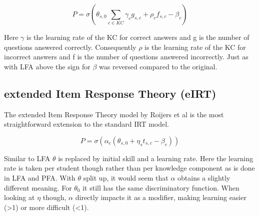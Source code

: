 \documentclass{scrartcl}
\begin{document}
\begin{equation}
P = \sigma(\theta_{s,0} \sum_{c \in KC}  \gamma_{c} g_{s,c} + \rho_{c} f_{s,c} - \beta_{c})
\end{equation}

Here $\gamma$ is the learning rate of the KC for correct answers and g is the number of questions answered correctly. Consequently $\rho$ is the learning rate of the KC for incorrect answers and f is the number of questions answered incorrectly. Just as with LFA above the sign for $\beta$ was reversed compared to the original.

\begin{comment}
To compare the PFA parameter values to LFA values, the weighted average (according to the ratio g:f for each problem) of $\gamma$ and $\rho$ should be compared to $\eta$. $\theta$ cannot be compared when comparing PFA on LFA data, vice versa, $\theta$ should be compared to 0. In case of PFA+ $\theta$ values can be compared directly.

\begin{mycapequ}
\begin{equation}
\eta_{c}: \frac{\gamma_{c} g_{c} + \rho_{c} f_{c}}{g_{c}+f_{c}}
\end{equation}
\caption{Comparison of LFA parameters to PFA parameters}
\end{mycapequ}
\end{comment}

\subsection{extended Item Response Theory (eIRT)}
\label{sec:eirt}
The extended Item Response Theory model by Roijers et al \cite{eirt} is the most straightforward extension to the standard IRT model.

\begin{equation}
\label{eq:eirt}
P = \sigma(\alpha_{c} (\theta_{s,0} + \eta_{s} t_{s,c} - \beta_{c}))
\end{equation}

Similar to LFA $\theta$ is replaced by initial skill and a learning rate. Here the learning rate is taken per student though rather than per knowledge component as is done in LFA and PFA. With $\theta$ split up, it would seem that $\alpha$ obtains a slightly different meaning. For $\theta_{0}$ it still has the same discriminatory function. When looking at $\eta$ though, $\alpha$ directly impacts it as a modifier, making learning easier (>1) or more difficult (<1).
\end{document}

